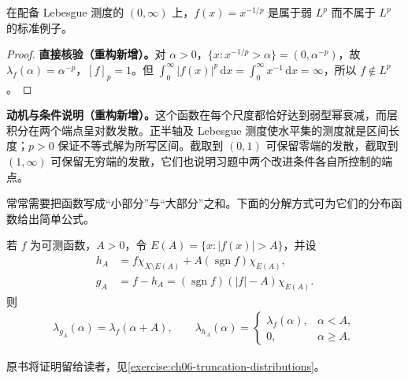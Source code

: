 \documentclass[../../main.tex]{subfiles}
\begin{document}
\begin{example}\label{example:ch06-weak-not-strong}
在配备 Lebesgue 测度的 $(0,\infty)$ 上，$f(x)=x^{-1/p}$ 是属于弱 $L^p$ 而不属于 $L^p$ 的标准例子。
\end{example}
\begin{proof}
\textbf{直接核验（重构新增）。}对 $\alpha>0$，$\{x:x^{-1/p}>\alpha\}=(0,\alpha^{-p})$，故 $\lambda_f(\alpha)=\alpha^{-p}$，$[f]_p=1$。但 $\int_0^\infty|f(x)|^p\,\mathrm dx=\int_0^\infty x^{-1}\,\mathrm dx=\infty$，所以 $f\notin L^p$。
\end{proof}
\begin{remark}
\textbf{动机与条件说明（重构新增）。}这个函数在每个尺度都恰好达到弱型幂衰减，而层积分在两个端点呈对数发散。正半轴及 Lebesgue 测度使水平集的测度就是区间长度；$p>0$ 保证不等式解为所写区间。截取到 $(0,1)$ 可保留零端的发散，截取到 $(1,\infty)$ 可保留无穷端的发散，它们也说明习题中两个改进条件各自所控制的端点。
\end{remark}
常常需要把函数写成“小部分”与“大部分”之和。下面的分解方式可为它们的分布函数给出简单公式。
\begin{proposition}\label{proposition:ch06-distribution-truncation}
若 $f$ 为可测函数，$A>0$，令 $E(A)=\{x:|f(x)|>A\}$，并设
\begin{align*}
h_A&=f\chi_{X\setminus E(A)}+A(\operatorname{sgn}f)\chi_{E(A)},\\
g_A&=f-h_A=(\operatorname{sgn}f)(|f|-A)\chi_{E(A)}.
\end{align*}
则
\begin{align*}
\lambda_{g_A}(\alpha)=\lambda_f(\alpha+A),\qquad
\lambda_{h_A}(\alpha)=\begin{cases}\lambda_f(\alpha),&\alpha<A,\\0,&\alpha\geqslant A.\end{cases}
\end{align*}
\end{proposition}
原书将证明留给读者，见\cref{exercise:ch06-truncation-distributions}。
\end{document}
